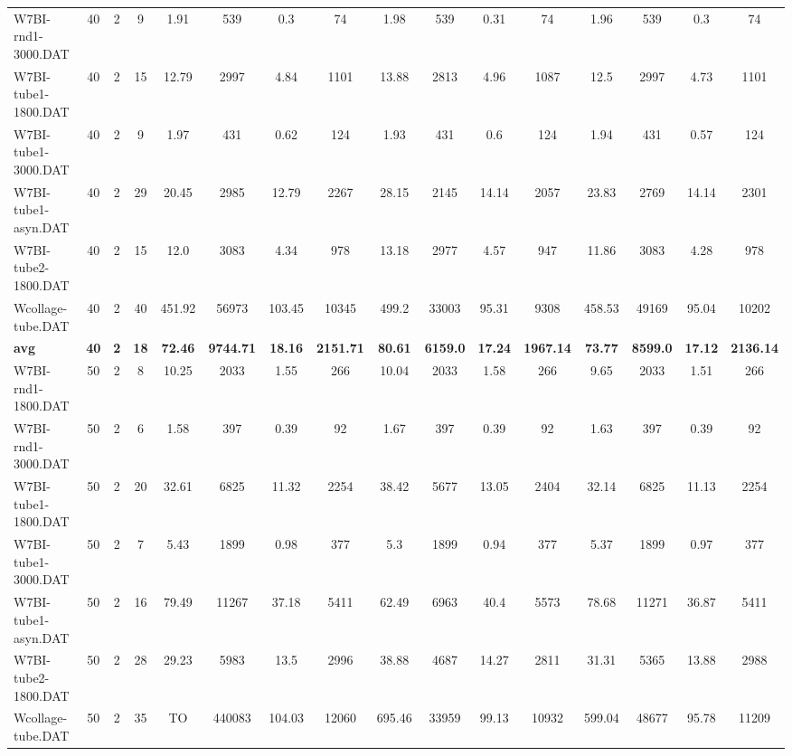 \begin{sidewaystable}[!ht]
{\begin{tabular}{lccccccccccccccc}
W7BI-rnd1-3000.DAT & 40 & 2 & 9 & 1.91 & 539 &  \textcolor{blue2}{0.3} & 74 & 1.98 & 539 & 0.31 & 74 & 1.96 & 539 &  \textcolor{blue2}{0.3} & 74 \\
W7BI-tube1-1800.DAT & 40 & 2 & 15 & 12.79 & 2997 & 4.84 & 1101 & 13.88 & 2813 & 4.96 & 1087 & 12.5 & 2997 &  \textcolor{blue2}{4.73} & 1101 \\
W7BI-tube1-3000.DAT & 40 & 2 & 9 & 1.97 & 431 & 0.62 & 124 & 1.93 & 431 & 0.6 & 124 & 1.94 & 431 &  \textcolor{blue2}{0.57} & 124 \\
W7BI-tube1-asyn.DAT & 40 & 2 & 29 & 20.45 & 2985 &  \textcolor{blue2}{12.79} & 2267 & 28.15 & 2145 & 14.14 & 2057 & 23.83 & 2769 & 14.14 & 2301 \\
W7BI-tube2-1800.DAT & 40 & 2 & 15 & 12.0 & 3083 & 4.34 & 978 & 13.18 & 2977 & 4.57 & 947 & 11.86 & 3083 &  \textcolor{blue2}{4.28} & 978 \\
Wcollage-tube.DAT & 40 & 2 & 40 & 451.92 & 56973 & 103.45 & 10345 & 499.2 & 33003 & 95.31 & 9308 & 458.53 & 49169 &  \textcolor{blue2}{95.04} & 10202 \\
\cline{1-16} \textbf{avg} & \textbf{40} & \textbf{2} & \textbf{18} & \textbf{72.46} & \textbf{9744.71} & \textbf{18.16} & \textbf{2151.71} & \textbf{80.61} & \textbf{6159.0} & \textbf{17.24} & \textbf{1967.14} & \textbf{73.77} & \textbf{8599.0} & \textbf{17.12} & \textbf{2136.14} \\ \cline{1-16}
W7BI-rnd1-1800.DAT & 50 & 2 & 8 & 10.25 & 2033 & 1.55 & 266 & 10.04 & 2033 & 1.58 & 266 & 9.65 & 2033 &  \textcolor{blue2}{1.51} & 266 \\
W7BI-rnd1-3000.DAT & 50 & 2 & 6 & 1.58 & 397 &  \textcolor{blue2}{0.39} & 92 & 1.67 & 397 &  \textcolor{blue2}{0.39} & 92 & 1.63 & 397 &  \textcolor{blue2}{0.39} & 92 \\
W7BI-tube1-1800.DAT & 50 & 2 & 20 & 32.61 & 6825 & 11.32 & 2254 & 38.42 & 5677 & 13.05 & 2404 & 32.14 & 6825 &  \textcolor{blue2}{11.13} & 2254 \\
W7BI-tube1-3000.DAT & 50 & 2 & 7 & 5.43 & 1899 & 0.98 & 377 & 5.3 & 1899 &  \textcolor{blue2}{0.94} & 377 & 5.37 & 1899 & 0.97 & 377 \\
W7BI-tube1-asyn.DAT & 50 & 2 & 16 & 79.49 & 11267 & 37.18 & 5411 & 62.49 & 6963 & 40.4 & 5573 & 78.68 & 11271 &  \textcolor{blue2}{36.87} & 5411 \\
W7BI-tube2-1800.DAT & 50 & 2 & 28 & 29.23 & 5983 &  \textcolor{blue2}{13.5} & 2996 & 38.88 & 4687 & 14.27 & 2811 & 31.31 & 5365 & 13.88 & 2988 \\
Wcollage-tube.DAT & 50 & 2 & 35 &  TO & 440083 & 104.03 & 12060 & 695.46 & 33959 & 99.13 & 10932 & 599.04 & 48677 &  \textcolor{blue2}{95.78} & 11209 \\

\end{tabular}}
\end{sidewaystable}
